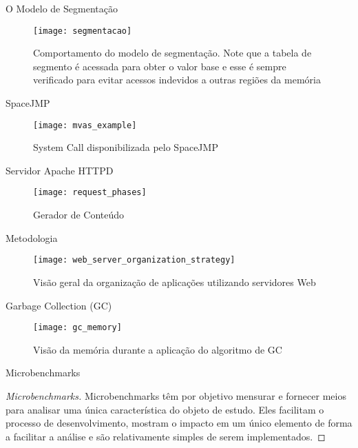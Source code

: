 \documentclass[xcolor={usenames,svgnames,dvipsnames},brazil,english,12pt,aspectratio=149]{beamer}
\begin{document}
\begin{frame}{O Modelo de Segmentação}
  \begin{figure}[!h]
    \centering
    \texttt{[image: segmentacao]} 
    \caption*{Comportamento do modelo de segmentação. Note que a tabela de segmento é acessada para obter o valor base e esse é sempre verificado para evitar acessos indevidos a outras regiões da memória}
  \end{figure}
\end{frame}

\begin{frame}{SpaceJMP}
  \begin{figure}[!h]
    \centering
    \texttt{[image: mvas\_example]} 
    \caption*{System Call disponibilizada pelo SpaceJMP}
  \end{figure}
\end{frame}

\begin{frame}{Servidor Apache HTTPD}
  \begin{figure}[!h]
    \centering
    \texttt{[image: request\_phases]} 
    \caption*{Gerador de Conteúdo}
  \end{figure}
\end{frame}

\begin{frame}{Metodologia}
  \begin{figure}[!h] \centering
    \texttt{[image: web\_server\_organization\_strategy]}
    \caption*{Visão geral da organização de aplicações utilizando servidores Web}
  \end{figure}
\end{frame}

\begin{frame}{Garbage Collection (GC)}
  \begin{figure}[!h]
    \centering
    \texttt{[image: gc\_memory]}
    \caption*{Visão da memória durante a aplicação do algoritmo de GC}
  \end{figure}
\end{frame}

\begin{frame}{Microbenchmarks}
  \begin{proof}[Microbenchmarks]
Microbenchmarks têm por objetivo mensurar e fornecer meios para analisar uma
única característica do objeto de estudo. Eles facilitam o processo de
desenvolvimento, mostram o impacto em um único elemento de forma a facilitar a
análise e são relativamente simples de serem implementados.
  \end{proof}
\end{frame}
\end{document}
